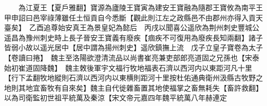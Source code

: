 　　為江夏王【夏戶雅翻】寶源為廬陵王寶寅為建安王寶融為隨郡王寶攸為南平王　甲申詔曰邑宰祿薄雖任土恒貢自今悉斷【觀此則江左之政縣邑不由郡州亦得入貢天臺矣】　乙酉追尊始安真王為景皇妃為懿后　丙戌以聞喜公遥欣為荆州刺史豐城公遥昌為豫州刺史時上長子晉安王寶義有廢疾【痼疾不可復用為廢疾長知兩翻】諸子皆弱小故以遥光居中【居中謂為揚州刺史】遥欣鎮撫上流　戊子立皇子寶卷為太子【卷讀曰捲】　魏主至洛陽欲澄清流品以尚書崔亮兼吏部郎亮道固之兄孫也【宋泰始初崔道固降魏】　魏主敇後軍宇文福行牧地福表石濟以西河内以東距河凡十里【行下孟翻牧地縱則石濟以西河内以東横則距河十里按杜佑通典衛州汲縣古牧野之地則其地宜畜牧有自來矣】魏主自代徙雜畜置其地使福掌之畜無耗失【畜許救翻】以為司衛監初世祖平統萬及秦涼【宋文帝元嘉四年魏平統萬八年赫連定